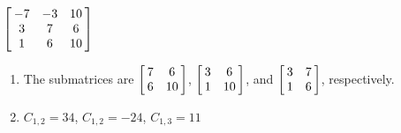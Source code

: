 {$\left[\hskip -3pt \begin{array}{ccc} -7&-3&10\\  3&7&6
\\  1&6&10\end{array}\hskip -3pt \right] $} 
{\begin{enumerate}
\item The submatrices are $\left[\hskip -3pt \begin{array}{cc} 7&6\\  6&10\end {array} \hskip -3pt
 \right] $, $ \left[\hskip -3pt \begin{array}{cc} 3&6\\  1&10\end{array}\hskip -3pt \right] $, and 
 $\left[\hskip -3pt \begin{array}{cc} 3&7\\  1&6\end {array} \hskip -3pt
 \right] $, respectively.
 \item	$C_{1,2}=34$, $C_{1,2}=-24$, $C_{1,3}=11$
 \end{enumerate}
}